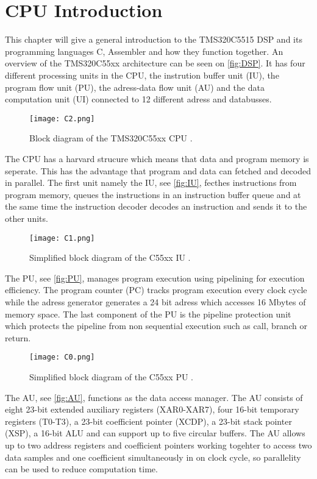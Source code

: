 \chapter{CPU Introduction}
This chapter will give a general introduction to the TMS320C5515 DSP and its programming languages C, Assembler and how they function together. An overview of the TMS320C55xx architecture can be seen on \autoref{fig:DSP}. It has four different processing units in the CPU, the instrution buffer unit (IU), the program flow unit (PU), the adress-data flow unit (AU) and the data computation unit (UI) connected to 12 different adress and databusses.  
\begin{figure}[H]
\centering
\texttt{[image: C2.png]}
\caption{Block diagram of the TMS320C55xx CPU \citep{signalProcessBook}.}
\label{fig:DSP}
\end{figure}
The CPU has a harvard strucure which means that data and program memory is seperate. This has the advantage that program and data can fetched and decoded in parallel. The first unit namely the IU, see \autoref{fig:IU}, fecthes instructions from program memory, queues the instructions in an instruction buffer queue and at the same time the instruction decoder decodes an instruction and sends it to the other units.
\begin{figure}[H]
\centering
\texttt{[image: C1.png]}
\caption{Simplified block diagram of the C55xx IU \citep{signalProcessBook}.}
\label{fig:IU}
\end{figure}
The PU, see \autoref{fig:PU}, manages program execution using pipelining for execution efficiency. The program counter (PC) tracks program execution every clock cycle while the adress generator generates a 24 bit adress which accesses 16 Mbytes of memory space. The last component of the PU is the pipeline protection unit which protects the pipeline from non sequential execution such as call, branch or return.
\begin{figure}[H]
\centering
\texttt{[image: C0.png]}
\caption{Simplified block diagram of the C55xx PU \citep{signalProcessBook}.}
\label{fig:PU}
\end{figure}
The AU, see \autoref{fig:AU}, functions as the data access manager. The AU consists of eight 23-bit extended auxiliary registers (XAR0-XAR7), four 16-bit temporary registers (T0-T3), a 23-bit coefficient pointer (XCDP), a 23-bit stack pointer (XSP), a 16-bit ALU and can support up to five circular buffers. The AU allows up to two address registers and coefficient pointers working togehter to access two data samples and one coefficient simultaneously in on clock cycle, so parallelity can be used to reduce computation time. 
